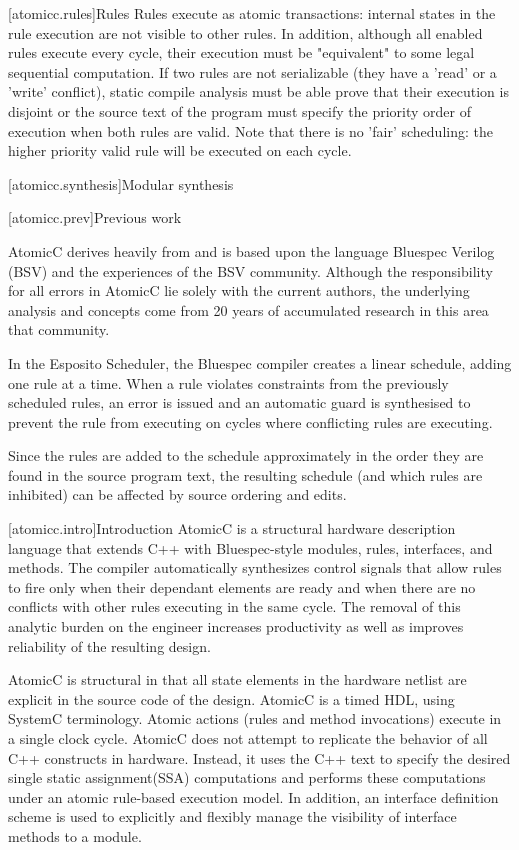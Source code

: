 [atomicc.rules]{Rules}
Rules execute as atomic transactions: internal states in the rule
execution are not visible to other rules.  In addition, although all enabled
rules execute every cycle, their execution must be 
"equivalent" to some legal sequential computation.
If two rules are not serializable (they have a 'read' or a 'write' conflict),
static compile analysis must be able prove that their execution is disjoint
or the source text of the program must specify the priority order of execution
when both rules are valid.
Note that there is no 'fair' scheduling: the higher priority valid rule will
be executed on each cycle.

[atomicc.synthesis]{Modular synthesis}

[atomicc.prev]{Previous work}

AtomicC derives heavily from and is based upon the language Bluespec Verilog (BSV)
and the experiences of the BSV community.  Although the responsibility for all
errors in AtomicC lie solely with the current authors, the underlying analysis and
concepts come from 20 years of accumulated research in this area that community.

In the Esposito Scheduler\cite{Esposito:Patent},
the Bluespec compiler creates a linear schedule, adding
one rule at a time.  When a rule violates constraints from the previously scheduled
rules, an error is issued and an automatic guard is synthesised to prevent the
rule from executing on cycles where conflicting rules are executing.

Since the rules are added to the schedule approximately in the order they are
found in the source program text, the resulting schedule (and which rules are
inhibited) can be affected by source ordering and edits.

[atomicc.intro]{Introduction}
AtomicC is a structural hardware description language that extends C++
with Bluespec-style\cite{Bluespec:www,Hoe:Thesis,HoeArvind:TRS_Synthesis2}
modules, rules, interfaces, and methods.
The compiler automatically synthesizes control signals that allow rules to fire
only when their dependant elements are ready and when there are no conflicts with
other rules executing in the same cycle.  The removal of this analytic burden on
the engineer increases productivity as well as improves reliability of the
resulting design.

AtomicC is structural in that all state elements in the hardware
netlist are explicit in the source code of the design. AtomicC is a
timed HDL, using SystemC terminology. 
Atomic actions (rules and method invocations) execute in a single clock cycle.
AtomicC does not attempt to replicate the behavior of all C++ constructs in hardware.
Instead, it uses the C++ text to specify the desired single static assignment(SSA) computations
and performs these computations under an atomic rule-based execution model.
In addition, an interface definition scheme is used to explicitly and flexibly
manage the visibility of interface methods to a module.

